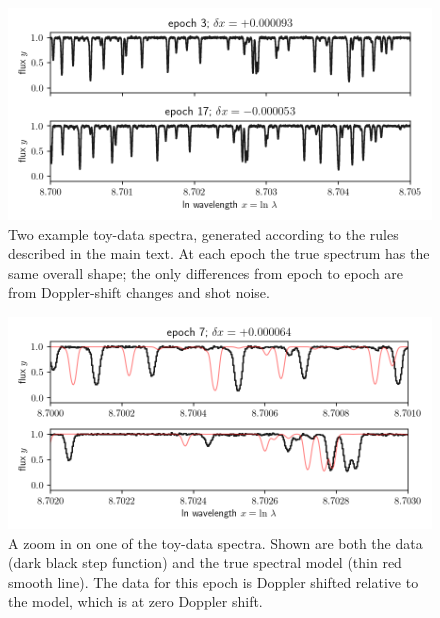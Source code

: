 \documentclass[modern]{aastex631}
\begin{document}
\begin{figure}[tp]
  \begin{mdframed}
    \begin{center}
    \includegraphics[width=\textwidth]{../notebook/data.png}
    \end{center}
    \caption{Two example toy-data spectra, generated according to the rules described in the main text.
    At each epoch the true spectrum has the same overall shape; the only differences from epoch to epoch are from Doppler-shift changes and shot noise.\label{fig:data}}
  \end{mdframed}
\end{figure}
\begin{figure}[tp]
  \begin{mdframed}
    \begin{center}
    \includegraphics[width=\textwidth]{../notebook/datazoom.png}
    \end{center}
    \caption{A zoom in on one of the toy-data spectra. Shown are both the data (dark black step function) and the true spectral model (thin red smooth line). The data for this epoch is Doppler shifted relative to the model, which is at zero Doppler shift.\label{fig:datazoom}}
  \end{mdframed}
\end{figure}
\end{document}
